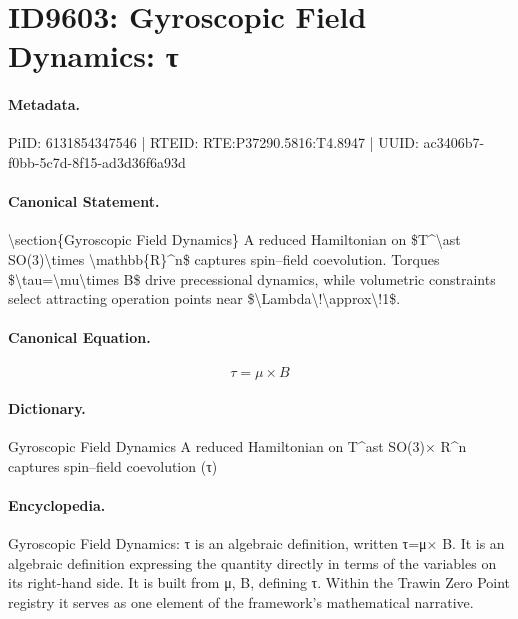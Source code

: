 \section*{ID9603: Gyroscopic Field Dynamics: τ}
\paragraph{Metadata.}
PiID: 6131854347546 | RTEID: RTE:P37290.5816:T4.8947 | UUID: ac3406b7-f0bb-5c7d-8f15-ad3d36f6a93d

\paragraph{Canonical Statement.}
\textbackslash{}section\{Gyroscopic Field Dynamics\} A reduced Hamiltonian on \$T\textasciicircum{}\textbackslash{}ast SO(3)\textbackslash{}times \textbackslash{}mathbb\{R\}\textasciicircum{}n\$ captures spin--field coevolution. Torques \$\textbackslash{}tau=\textbackslash{}mu\textbackslash{}times B\$ drive precessional dynamics, while volumetric constraints select attracting operation points near \$\textbackslash{}Lambda\textbackslash{}!\textbackslash{}approx\textbackslash{}!1\$.

\paragraph{Canonical Equation.}
\[
\tau=\mu\times B
\]

\paragraph{Dictionary.}
Gyroscopic Field Dynamics A reduced Hamiltonian on T\textasciicircum{}ast SO(3)× R\textasciicircum{}n captures spin--field coevolution (τ)

\paragraph{Encyclopedia.}
Gyroscopic Field Dynamics: τ is an algebraic definition, written τ=μ× B. It is an algebraic definition expressing the quantity directly in terms of the variables on its right-hand side. It is built from μ, B, defining τ. Within the Trawin Zero Point registry it serves as one element of the framework's mathematical narrative.
